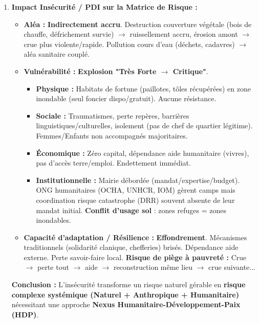 \documentclass[11pt]{article}
\begin{document}
\begin{exoresolu}
\begin{enumerate}
    \item \textbf{Impact Insécurité / PDI sur la Matrice de Risque :}
          \begin{itemize}
              \item \textbf{Aléa :} \textbf{Indirectement accru}. Destruction couverture végétale (bois de chauffe, défrichement survie) $\rightarrow$ ruissellement accru, érosion amont $\rightarrow$ crue plus violente/rapide. Pollution cours d'eau (déchets, cadavres) $\rightarrow$ aléa sanitaire couplé.
              \item \textbf{Vulnérabilité :} \textbf{Explosion "Très Forte $\rightarrow$ Critique"}.
                  \begin{itemize}
                      \item \textbf{Physique :} Habitats de fortune (paillotes, tôles récupérées) en zone inondable (seul foncier dispo/gratuit). Aucune résistance.
                      \item \textbf{Sociale :} Traumatismes, perte repères, barrières linguistiques/culturelles, isolement (pas de chef de quartier légitime). Femmes/Enfants non accompagnés majoritaires.
                      \item \textbf{Économique :} Zéro capital, dépendance aide humanitaire (vivres), pas d'accès terre/emploi. Endettement immédiat.
                      \item \textbf{Institutionnelle :} Mairie débordée (mandat/expertise/budget). ONG humanitaires (OCHA, UNHCR, IOM) gèrent camps mais coordination risque catastrophe (DRR) souvent absente de leur mandat initial. \textbf{Conflit d'usage sol} : zones refuges = zones inondables.
                  \end{itemize}
              \item \textbf{Capacité d'adaptation / Résilience :} \textbf{Effondrement}. Mécanismes traditionnels (solidarité clanique, chefferies) brisés. Dépendance aide externe. Perte savoir-faire local. \textbf{Risque de piège à pauvreté :} Crue $\rightarrow$ perte tout $\rightarrow$ aide $\rightarrow$ reconstruction même lieu $\rightarrow$ crue suivante...
          \end{itemize}
          \textbf{Conclusion :} L'insécurité transforme un risque naturel gérable en \textbf{risque complexe systémique (Naturel + Anthropique + Humanitaire)} nécessitant une approche \textbf{Nexus Humanitaire-Développement-Paix (HDP)}.
\end{enumerate}
\end{exoresolu}
\end{document}
